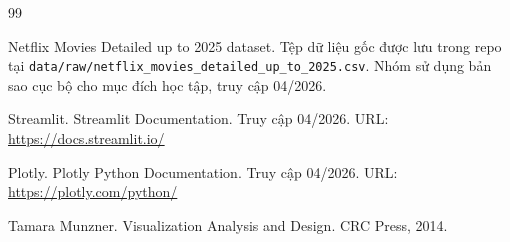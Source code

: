 \newpage
{}
\begin{thebibliography}{99}
\raggedright\sloppy

Netflix Movies Detailed up to 2025 dataset.
\newblock Tệp dữ liệu gốc được lưu trong repo tại \texttt{data/raw/netflix\_movies\_detailed\_up\_to\_2025.csv}.
\newblock Nhóm sử dụng bản sao cục bộ cho mục đích học tập, truy cập 04/2026.

Streamlit.
\newblock Streamlit Documentation.
\newblock Truy cập 04/2026.
\newblock URL: \url{https://docs.streamlit.io/}

Plotly.
\newblock Plotly Python Documentation.
\newblock Truy cập 04/2026.
\newblock URL: \url{https://plotly.com/python/}

Tamara Munzner.
\newblock Visualization Analysis and Design.
\newblock CRC Press, 2014.

\end{thebibliography}